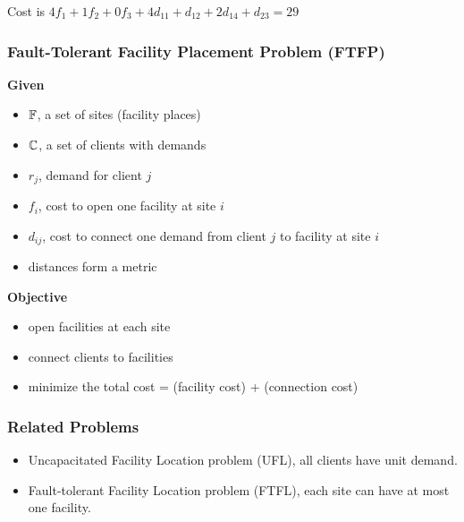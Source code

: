 \documentclass[handout, hyperref, dvipsnames]{beamer}
\begin{document}
\begin{frame}
\begin{figure}
{
  }
  \end{figure}

  Cost is $4f_1 + 1f_2 + 0f_3 + 4d_{11} + d_{12} + 2d_{14} +
  d_{23} = 29$
\end{frame}
\begin{frame}
  \frametitle{Fault-Tolerant Facility Placement Problem (FTFP)}
  \textbf{Given}
  \begin{itemize}
  \item $\mathbb{F}$, a set of sites (facility places)
  \item $\mathbb{C}$, a set of clients with demands
  \item $r_j$, demand for client $j$
  \item $f_i$, cost to open one facility at site $i$
  \item $d_{ij}$, cost to connect one demand from client $j$ to
    facility at site $i$
  \item distances form a metric
  \end{itemize}

  \textbf{Objective}
  \begin{itemize}
  \item open facilities at each site
  \item connect clients to facilities
  \item minimize the total cost = (facility cost) + (connection cost)
  \end{itemize}

\end{frame}

\begin{frame}
  \frametitle{Related Problems}
  \begin{center}
  \end{center}
  \begin{itemize}
  \item Uncapacitated Facility Location problem (UFL),
    all clients have unit demand.
  \item Fault-tolerant Facility Location problem (FTFL),
    each site can have at most one facility.
  \end{itemize}
\end{frame}
\end{document}
